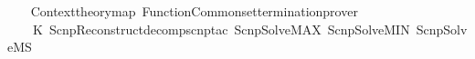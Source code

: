 \begin{isabellebody}
\ %
\isanewline
{\isacartoucheopen}\isanewline
\ \ Context{\isachardot}{\kern0pt}theory{\isacharunderscore}{\kern0pt}map\ {\isacharparenleft}{\kern0pt}Function{\isacharunderscore}{\kern0pt}Common{\isachardot}{\kern0pt}set{\isacharunderscore}{\kern0pt}termination{\isacharunderscore}{\kern0pt}prover\isanewline
\ \ \ \ {\isacharparenleft}{\kern0pt}K\ {\isacharparenleft}{\kern0pt}ScnpReconstruct{\isachardot}{\kern0pt}decomp{\isacharunderscore}{\kern0pt}scnp{\isacharunderscore}{\kern0pt}tac\ {\isacharbrackleft}{\kern0pt}ScnpSolve{\isachardot}{\kern0pt}MAX{\isacharcomma}{\kern0pt}\ ScnpSolve{\isachardot}{\kern0pt}MIN{\isacharcomma}{\kern0pt}\ ScnpSolve{\isachardot}{\kern0pt}MS{\isacharbrackright}{\kern0pt}{\isacharparenright}{\kern0pt}{\isacharparenright}{\kern0pt}{\isacharparenright}{\kern0pt}\isanewline
{\isacartoucheclose}%
\endisatagML
{\isafoldML}%
%
\isadelimML
\isanewline
%
\endisadelimML
%
\isadelimtheory
\isanewline
%
\endisadelimtheory
%
\isatagtheory
{}\isamarkupfalse%
%
\endisatagtheory
{\isafoldtheory}%
%
\isadelimtheory
%
\endisadelimtheory
%
\end{isabellebody}%
\endinput
